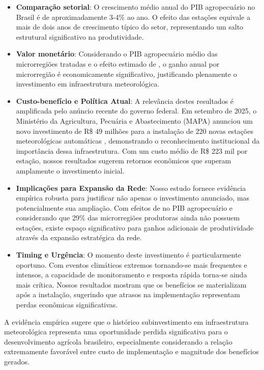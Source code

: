 \documentclass[
	12pt,				%
	oneside,			%
	a4paper,			%
	english,			%
	french,				%
	spanish,			%
	brazil				%
	]{abntex2}
\begin{document}
\begin{itemize}
\item \textbf{Comparação setorial}: O crescimento médio anual do PIB agropecuário no Brasil é de aproximadamente 3-4\% ao ano. O efeito das estações equivale a mais de dois anos de crescimento típico do setor, representando um salto estrutural significativo na produtividade.

\item \textbf{Valor monetário}: Considerando o PIB agropecuário médio das microrregiões tratadas e o efeito estimado de \mainattpct, o ganho anual por microrregião é economicamente significativo, justificando plenamente o investimento em infraestrutura meteorológica.

\item \textbf{Custo-benefício e Política Atual}: A relevância destes resultados é amplificada pelo anúncio recente do governo federal. Em setembro de 2025, o Ministério da Agricultura, Pecuária e Abastecimento (MAPA) anunciou um novo investimento de R\$ 49 milhões para a instalação de 220 novas estações meteorológicas automáticas \cite{mapa2024}, demonstrando o reconhecimento institucional da importância dessa infraestrutura. Com um custo médio de R\$ 223 mil por estação, nossos resultados sugerem retornos econômicos que superam amplamente o investimento inicial.

\item \textbf{Implicações para Expansão da Rede}: Nosso estudo fornece evidência empírica robusta para justificar não apenas o investimento anunciado, mas potencialmente sua ampliação. Com efeitos de \mainattpct{} no PIB agropecuário e considerando que 29\% das microrregiões produtoras ainda não possuem estações, existe espaço significativo para ganhos adicionais de produtividade através da expansão estratégica da rede.

\item \textbf{Timing e Urgência}: O momento deste investimento é particularmente oportuno. Com eventos climáticos extremos tornando-se mais frequentes e intensos, a capacidade de monitoramento e resposta rápida torna-se ainda mais crítica. Nossos resultados mostram que os benefícios se materializam após a instalação, sugerindo que atrasos na implementação representam perdas econômicas significativas.
\end{itemize}

A evidência empírica sugere que o histórico subinvestimento em infraestrutura meteorológica representa uma oportunidade perdida significativa para o desenvolvimento agrícola brasileiro, especialmente considerando a relação extremamente favorável entre custo de implementação e magnitude dos benefícios gerados.
\end{document}
